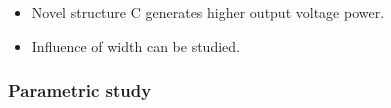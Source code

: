 \documentclass[compress]{beamer}
\begin{document}
\begin{frame}
{\begin{columns}[totalwidth=\textwidth]
\begin{column}{.49\textwidth}
   \end{column}
\end{columns}
}
\begin{exampleblock}{}
   \begin{itemize}[label=$\bullet$, font=\small, leftmargin=*]
	\item Novel structure C generates higher output voltage power.
	\item Influence of width can be studied.
	\end{itemize}
	\end{exampleblock}
\end{frame}

\begin{frame}\frametitle{Parametric study}
\end{frame}
\end{document}
